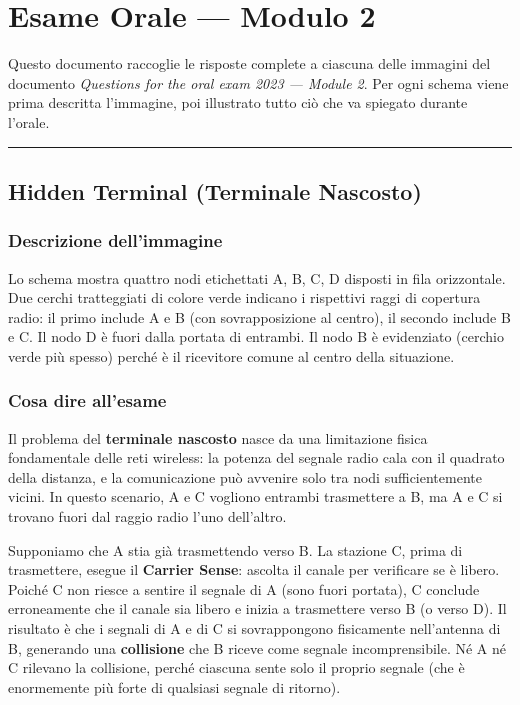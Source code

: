 \documentclass[
  italian,
  openany]{book}
\begin{document}
\newpage

\chapter{Esame Orale --- Modulo 2}\label{esame-orale-modulo-2}

Questo documento raccoglie le risposte complete a ciascuna delle
immagini del documento \emph{Questions for the oral exam 2023 --- Module
2}. Per ogni schema viene prima descritta l'immagine, poi illustrato
tutto ciò che va spiegato durante l'orale.

\begin{center}\rule{0.5\linewidth}{0.5pt}\end{center}

\section{Hidden Terminal (Terminale
Nascosto)}\label{hidden-terminal-terminale-nascosto}

\subsection{Descrizione dell'immagine}\label{descrizione-dellimmagine}

Lo schema mostra quattro nodi etichettati A, B, C, D disposti in fila
orizzontale. Due cerchi tratteggiati di colore verde indicano i
rispettivi raggi di copertura radio: il primo include A e B (con
sovrapposizione al centro), il secondo include B e C. Il nodo D è fuori
dalla portata di entrambi. Il nodo B è evidenziato (cerchio verde più
spesso) perché è il ricevitore comune al centro della situazione.

\subsection{Cosa dire all'esame}\label{cosa-dire-allesame}

Il problema del \textbf{terminale nascosto} nasce da una limitazione
fisica fondamentale delle reti wireless: la potenza del segnale radio
cala con il quadrato della distanza, e la comunicazione può avvenire
solo tra nodi sufficientemente vicini. In questo scenario, A e C
vogliono entrambi trasmettere a B, ma A e C si trovano fuori dal raggio
radio l'uno dell'altro.

Supponiamo che A stia già trasmettendo verso B. La stazione C, prima di
trasmettere, esegue il \textbf{Carrier Sense}: ascolta il canale per
verificare se è libero. Poiché C non riesce a sentire il segnale di A
(sono fuori portata), C conclude erroneamente che il canale sia libero e
inizia a trasmettere verso B (o verso D). Il risultato è che i segnali
di A e di C si sovrappongono fisicamente nell'antenna di B, generando
una \textbf{collisione} che B riceve come segnale incomprensibile. Né A
né C rilevano la collisione, perché ciascuna sente solo il proprio
segnale (che è enormemente più forte di qualsiasi segnale di ritorno).
\end{document}
